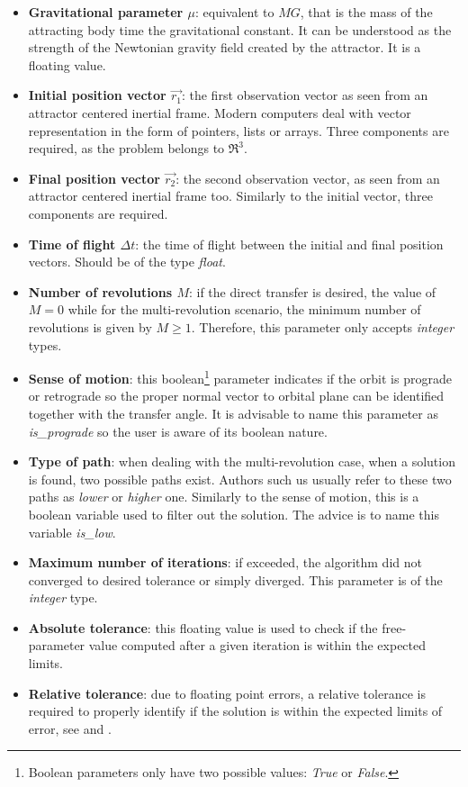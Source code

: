 \begin{itemize}
  \item \textbf{Gravitational parameter $\mu$}: equivalent to $MG$, that is the
        mass of the attracting body time the gravitational constant. It can be
        understood as the strength of the Newtonian gravity field created by the
        attractor. It is a floating value.
  \item \textbf{Initial position vector $\vec{r_1}$}: the first observation vector
        as seen from an attractor centered inertial frame. Modern computers deal
        with vector representation in the form of pointers, lists or arrays.
        Three components are required, as the problem belongs to $\Re^3$.
  \item \textbf{Final position vector $\vec{r_2}$}: the second observation vector,
        as seen from an attractor centered inertial frame too. Similarly to the
        initial vector, three components are required.
  \item \textbf{Time of flight \textit{$\Delta t$}}: the time of flight between the
        initial and final position vectors. Should be of the type
        \textit{float}.
  \item \textbf{Number of revolutions $M$}: if the direct transfer is desired, the
        value of $M=0$ while for the multi-revolution scenario, the minimum
        number of revolutions is given by $M\geq1$. Therefore, this parameter
        only accepts \textit{integer} types.
  \item \textbf{Sense of motion}: this boolean\footnote{Boolean parameters only
          have two possible values: \textit{True} or \textit{False}.} parameter
        indicates if the orbit is prograde or retrograde so the proper normal
        vector to orbital plane can be identified together with the transfer
        angle. It is advisable to name this parameter as \textit{is\_prograde}
        so the user is aware of its boolean nature.
  \item \textbf{Type of path}: when dealing with the multi-revolution case, when a
        solution is found, two possible paths exist. Authors such us
        \cite{sun1977} usually refer to
        these two paths as \textit{lower} or \textit{higher} one. Similarly to
        the sense of motion, this is a boolean variable used to filter out the
        solution. The advice is to name this variable \textit{is\_low}.
  \item \textbf{Maximum number of iterations}: if exceeded, the algorithm did
        not converged to desired tolerance or simply diverged. This parameter
        is of the \textit{integer} type.
  \item \textbf{Absolute tolerance}: this floating value is used to check if the
        free-parameter value computed after a given iteration is within the
        expected limits.
  \item \textbf{Relative tolerance}: due to floating point errors, a relative
        tolerance is required to properly identify if the solution is within
        the expected limits of error, see \cite{randomascii2012} and
        \cite{christer2008}.
\end{itemize}


